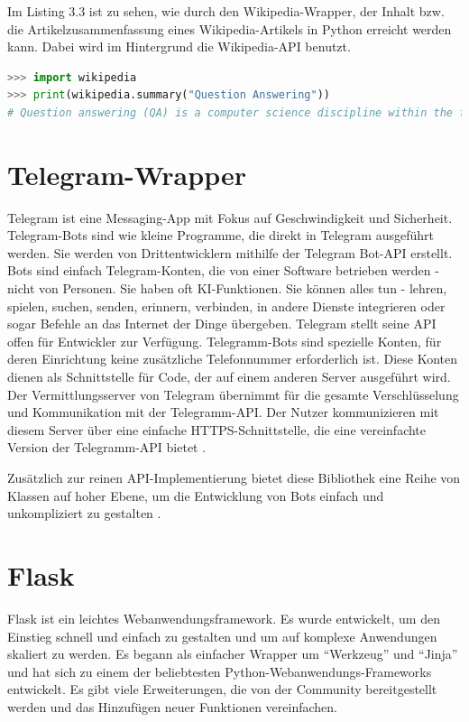 \documentclass[
        ngerman,
        paper=a4,
        numbers=noendperiod,
]{scrreprt}
\begin{document}
Im Listing 3.3 ist zu sehen, wie durch den Wikipedia-Wrapper, der Inhalt bzw. die Artikelzusammenfassung eines Wikipedia-Artikels in Python erreicht werden kann. Dabei wird im Hintergrund die Wikipedia-API \citep{API:HauptseiteMediaWiki} benutzt.


\begin{lstlisting}[language=Python, caption=Wikipedia Artikelzusammenfassungen]
>>> import wikipedia
>>> print(wikipedia.summary("Question Answering"))
# Question answering (QA) is a computer science discipline within the fields of information retrieval and natural language processing (NLP), which is concerned with building systems that automatically answer questions posed by humans in a natural language.
\end{lstlisting}


\section{Telegram-Wrapper}
Telegram ist eine Messaging-App mit Fokus auf Geschwindigkeit und Sicherheit. Telegram-Bots sind wie kleine Programme, die direkt in Telegram ausgeführt werden. Sie werden von Drittentwicklern mithilfe der Telegram Bot-API erstellt.
Bots sind einfach Telegram-Konten, die von einer Software betrieben werden - nicht von Personen. Sie haben oft KI-Funktionen. Sie können alles tun - lehren, spielen, suchen, senden, erinnern, verbinden, in andere Dienste integrieren oder sogar Befehle an das Internet der Dinge übergeben. Telegram stellt seine API offen für Entwickler zur Verfügung. Telegramm-Bots sind spezielle Konten, für deren Einrichtung keine zusätzliche Telefonnummer erforderlich ist. Diese Konten dienen als Schnittstelle für Code, der auf einem anderen Server ausgeführt wird. Der Vermittlungsserver von Telegram übernimmt für  die gesamte Verschlüsselung und Kommunikation mit der Telegramm-API. Der Nutzer  kommunizieren mit diesem Server über eine einfache HTTPS-Schnittstelle, die eine vereinfachte Version der Telegramm-API bietet \citep{TelegramFAQ}\citep{TelegramAPIs}.

Zusätzlich zur reinen API-Implementierung bietet diese Bibliothek eine Reihe von Klassen auf hoher Ebene, um die Entwicklung von Bots einfach und unkompliziert zu gestalten \citep{Python-telegram-bot/python-telegram-bot:Refuse}.


\section{Flask}
Flask ist ein leichtes Webanwendungsframework. Es wurde entwickelt, um den Einstieg schnell und einfach zu gestalten und um auf komplexe Anwendungen skaliert zu werden. Es begann als einfacher Wrapper um \enquote{Werkzeug} und \enquote{Jinja} und hat sich zu einem der beliebtesten Python-Webanwendungs-Frameworks entwickelt. Es gibt viele Erweiterungen, die von der Community bereitgestellt werden und das Hinzufügen neuer Funktionen vereinfachen.
\end{document}
